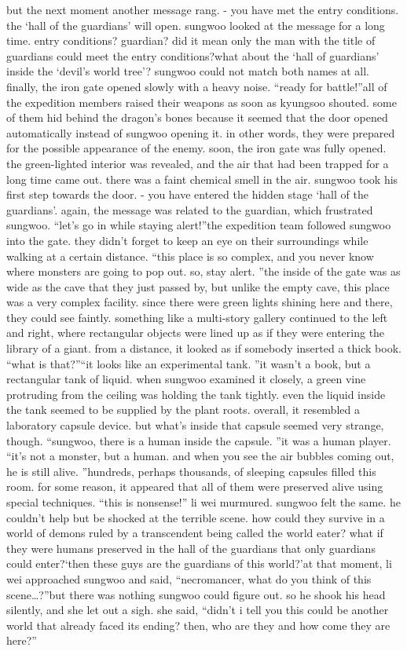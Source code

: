 but the next moment another message rang.
- you have met the entry conditions.
 the ‘hall of the guardians’ will open.
sungwoo looked at the message for a long time.
 entry conditions? guardian? did it mean only the man with the title of guardians could meet the entry conditions?what about the ‘hall of guardians’ inside the ‘devil’s world tree’? sungwoo could not match both names at all.
finally, the iron gate opened slowly with a heavy noise.
“ready for battle!”all of the expedition members raised their weapons as soon as kyungsoo shouted.
some of them hid behind the dragon’s bones because it seemed that the door opened automatically instead of sungwoo opening it.
 in other words, they were prepared for the possible appearance of the enemy.
soon, the iron gate was fully opened.
the green-lighted interior was revealed, and the air that had been trapped for a long time came out.
 there was a faint chemical smell in the air.
sungwoo took his first step towards the door.
- you have entered the hidden stage ‘hall of the guardians’.
again, the message was related to the guardian, which frustrated sungwoo.
“let’s go in while staying alert!”the expedition team followed sungwoo into the gate.
 they didn’t forget to keep an eye on their surroundings while walking at a certain distance.
“this place is so complex, and you never know where monsters are going to pop out.
 so, stay alert.
”the inside of the gate was as wide as the cave that they just passed by, but unlike the empty cave, this place was a very complex facility.
 since there were green lights shining here and there, they could see faintly.
 something like a multi-story gallery continued to the left and right, where rectangular objects were lined up as if they were entering the library of a giant.
from a distance, it looked as if somebody inserted a thick book.
“what is that?”“it looks like an experimental tank.
”it wasn’t a book, but a rectangular tank of liquid.
 when sungwoo examined it closely, a green vine protruding from the ceiling was holding the tank tightly.
even the liquid inside the tank seemed to be supplied by the plant roots.
 overall, it resembled a laboratory capsule device.
 but what’s inside that capsule seemed very strange, though.
“sungwoo, there is a human inside the capsule.
”it was a human player.
“it’s not a monster, but a human.
 and when you see the air bubbles coming out, he is still alive.
”hundreds, perhaps thousands, of sleeping capsules filled this room.
for some reason, it appeared that all of them were preserved alive using special techniques.
“this is nonsense!” li wei murmured.
sungwoo felt the same.
 he couldn’t help but be shocked at the terrible scene.
how could they survive in a world of demons ruled by a transcendent being called the world eater? what if they were humans preserved in the hall of the guardians that only guardians could enter?‘then these guys are the guardians of this world?’at that moment, li wei approached sungwoo and said, “necromancer, what do you think of this scene…?”but there was nothing sungwoo could figure out.
 so he shook his head silently, and she let out a sigh.
she said, “didn’t i tell you this could be another world that already faced its ending? then, who are they and how come they are here?”


